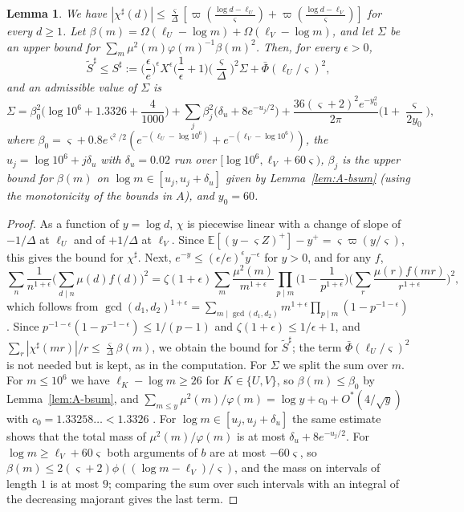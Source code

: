 \documentclass[11pt]{amsart}
\numberwithin{equation}{section}
\newtheorem{lemma}[theorem]{Lemma}
\theoremstyle{definition}
\theoremstyle{remark}
\begin{document}
\begin{lemma}\label{lem:A-St}
We have $|\chi^\sharp(d)| \leq \frac\varsigma\Delta[\varpi(\frac{\log d - \ell_U}\varsigma) + \varpi(\frac{\log d - \ell_V}\varsigma)]$ for every $d \geq 1$.
Let $\beta(m) = \Omega(\ell_U - \log m) + \Omega(\ell_V - \log m)$, and let $\Sigma$ be an upper bound for $\sum_m\mu^2(m)\varphi(m)^{-1}\beta(m)^2$.
Then, for every $\epsilon > 0$,
\[
\widetilde S^\sharp \leq S^\sharp := \Big(\frac\epsilon e\Big)^\epsilon X^\epsilon\Big(\frac1\epsilon + 1\Big)\Big(\frac\varsigma\Delta\Big)^2\Sigma + \bar\Phi(\ell_U/\varsigma)^2,
\]
and an admissible value of $\Sigma$ is
\[
\Sigma = \beta_0^2\Big(\log10^6 + 1.3326 + \frac4{1000}\Big) + \sum_j\beta_j^2\Big(\delta_u + 8e^{-u_j/2}\Big) + \frac{36(\varsigma + 2)^2e^{-y_0^2}}{2\pi}\Big(1 + \frac{\varsigma}{2y_0}\Big),
\]
where $\beta_0 = \varsigma + 0.8e^{\varsigma^2/2}(e^{-(\ell_U - \log10^6)} + e^{-(\ell_V - \log10^6)})$, the $u_j = \log10^6 + j\delta_u$ with $\delta_u = 0.02$ run over $[\log10^6, \ell_V + 60\varsigma)$, $\beta_j$ is the upper bound for $\beta(m)$ on $\log m \in [u_j, u_j + \delta_u]$ given by Lemma~\ref{lem:A-bsum} (using the monotonicity of the bounds in $A$), and $y_0 = 60$.
\end{lemma}

\begin{proof}
As a function of $y = \log d$, $\chi$ is piecewise linear with a change of slope of $-1/\Delta$ at $\ell_U$ and of $+1/\Delta$ at $\ell_V$.
Since $\mathbb E[(y - \varsigma Z)^+] - y^+ = \varsigma\varpi(y/\varsigma)$, this gives the bound for $\chi^\sharp$.
Next, $e^{-y} \leq (\epsilon/e)^\epsilon y^{-\epsilon}$ for $y > 0$, and for any $f$,
\[
\sum_n\frac1{n^{1+\epsilon}}\Big(\sum_{d\mid n}\mu(d)f(d)\Big)^2 = \zeta(1 + \epsilon)\sum_m\frac{\mu^2(m)}{m^{1+\epsilon}}\prod_{p\mid m}\Big(1 - \frac1{p^{1+\epsilon}}\Big)\Big(\sum_r\frac{\mu(r)f(mr)}{r^{1+\epsilon}}\Big)^2,
\]
which follows from $\gcd(d_1, d_2)^{1+\epsilon} = \sum_{m\mid\gcd(d_1,d_2)}m^{1+\epsilon}\prod_{p\mid m}(1 - p^{-1-\epsilon})$.
Since $p^{-1-\epsilon}(1 - p^{-1-\epsilon}) \leq 1/(p - 1)$ and $\zeta(1 + \epsilon) \leq 1/\epsilon + 1$, and $\sum_r|\chi^\sharp(mr)|/r \leq \frac\varsigma\Delta\beta(m)$, we obtain the bound for $\widetilde S^\sharp$; the term $\bar\Phi(\ell_U/\varsigma)^2$ is not needed but is kept, as in the computation.
For $\Sigma$ we split the sum over $m$.
For $m \leq 10^6$ we have $\ell_K - \log m \geq 26$ for $K \in \{U, V\}$, so $\beta(m) \leq \beta_0$ by Lemma~\ref{lem:A-bsum}, and $\sum_{m\leq y}\mu^2(m)/\varphi(m) = \log y + c_0 + O^*(4/\sqrt y)$ with $c_0 = 1.33258\ldots < 1.3326$ \cite{RamareAkhilesh}.
For $\log m \in [u_j, u_j + \delta_u]$ the same estimate shows that the total mass of $\mu^2(m)/\varphi(m)$ is at most $\delta_u + 8e^{-u_j/2}$.
For $\log m \geq \ell_V + 60\varsigma$ both arguments of $b$ are at most $-60\varsigma$, so $\beta(m) \leq 2(\varsigma + 2)\phi((\log m - \ell_V)/\varsigma)$, and the mass on intervals of length $1$ is at most $9$; comparing the sum over such intervals with an integral of the decreasing majorant gives the last term.
\end{proof}
\end{document}

